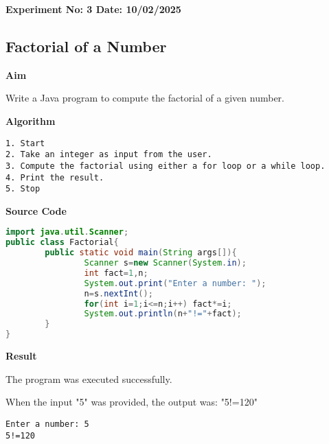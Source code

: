 \textbf{Experiment No: 3 \hfill Date: 10/02/2025}

\begin{center}
    \Large \subsection*{Factorial of a Number}
\end{center}

\textbf{Aim}
\vspace{0.5cm}

Write a Java program to compute the factorial of a given number.

\vspace{0.5cm}
\textbf{Algorithm}
\vspace{0.5cm}
\begin{verbatim}
1. Start
2. Take an integer as input from the user.
3. Compute the factorial using either a for loop or a while loop.
4. Print the result.
5. Stop
\end{verbatim}

\vspace{0.5cm}
\textbf{Source Code}
\begin{lstlisting}[language=Java]
import java.util.Scanner;
public class Factorial{
        public static void main(String args[]){
                Scanner s=new Scanner(System.in);
                int fact=1,n;
                System.out.print("Enter a number: ");
                n=s.nextInt();
                for(int i=1;i<=n;i++) fact*=i;
                System.out.println(n+"!="+fact);
        }
}
\end{lstlisting}

\vspace{0.5cm}
\textbf{Result}
\vspace{0.5cm}

The program was executed successfully. 

When the input "5" was provided, the output was: "5!=120"
\begin{verbatim}
Enter a number: 5
5!=120
\end{verbatim}

